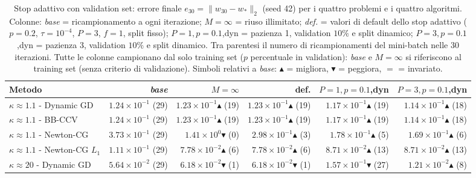 \begin{table}[H]
\centering
\tiny
\renewcommand{\arraystretch}{1.0}
\setlength{\tabcolsep}{1.5pt}
\caption{Stop adattivo con validation set: errore finale $e_{30}=\|w_{30}-w_*\|_2$ (seed 42) per i quattro problemi e i quattro algoritmi. Colonne: \emph{base} = ricampionamento a ogni iterazione; $M{=}\infty$ = riuso illimitato; \emph{def.} = valori di default dello stop adattivo ($p=0.2$, $\tau=10^{-4}$, $P=3$, $f=1$, split fisso); $P{=}1,p{=}0.1$,dyn = pazienza 1, validation $10\%$ e split dinamico; $P{=}3,p{=}0.1$,dyn = pazienza 3, validation $10\%$ e split dinamico. Tra parentesi il numero di ricampionamenti del mini-batch nelle 30 iterazioni. Tutte le colonne campionano dal solo training set ($p$ percentuale in validation): \emph{base} e $M{=}\infty$ si riferiscono al training set (senza criterio di validazione). Simboli relativi a \emph{base}: $\blacktriangle$ = migliora, $\blacktriangledown$ = peggiora, $=$ = invariato.}
\label{tab:riuso_valid_confronto}
\begin{tabular}{@{}lrrrrr@{}}
\toprule
Metodo & \emph{base} & $M{=}\infty$ & def. & $P{=}1,p{=}0.1$,dyn & $P{=}3,p{=}0.1$,dyn\\
\midrule
$\kappa\approx1.1$ - Dynamic GD & $1.24\times10^{-1}$ (29) & $1.23\times10^{-1}$$\blacktriangle$ (19) & $1.23\times10^{-1}$$\blacktriangle$ (19) & $1.17\times10^{-1}$$\blacktriangle$ (19) & $1.14\times10^{-1}$$\blacktriangle$ (18)\\
$\kappa\approx1.1$ - BB-CCV & $1.24\times10^{-1}$ (29) & $1.23\times10^{-1}$$\blacktriangle$ (19) & $1.23\times10^{-1}$$\blacktriangle$ (19) & $1.17\times10^{-1}$$\blacktriangle$ (19) & $1.14\times10^{-1}$$\blacktriangle$ (18)\\
$\kappa\approx1.1$ - Newton-CG & $3.73\times10^{-1}$ (29) & $1.41\times10^{0}$$\blacktriangledown$ (0) & $2.98\times10^{-1}$$\blacktriangle$ (3) & $1.78\times10^{-1}$$\blacktriangle$ (5) & $1.69\times10^{-1}$$\blacktriangle$ (6)\\
$\kappa\approx1.1$ - Newton-CG $L_1$ & $1.11\times10^{-1}$ (29) & $7.78\times10^{-2}$$\blacktriangle$ (6) & $7.78\times10^{-2}$$\blacktriangle$ (6) & $8.71\times10^{-2}$$\blacktriangle$ (13) & $8.71\times10^{-2}$$\blacktriangle$ (13)\\
\midrule
$\kappa\approx20$ - Dynamic GD & $5.64\times10^{-2}$ (29) & $6.18\times10^{-2}$$\blacktriangledown$ (1) & $6.18\times10^{-2}$$\blacktriangledown$ (1) & $1.57\times10^{-1}$$\blacktriangledown$ (27) & $1.21\times10^{-2}$$\blacktriangle$ (8)\\

\end{tabular}
\end{table}
